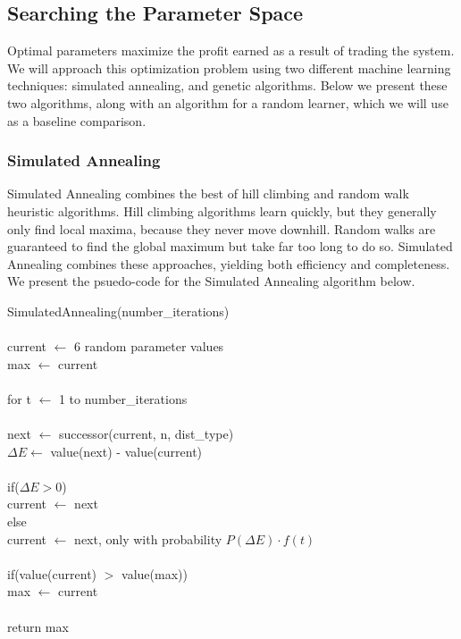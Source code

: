 \documentclass[10pt]{article}
\begin{document}
\subsection{Searching the Parameter Space}

Optimal parameters maximize the profit earned as a result of trading the
system.  We will approach this optimization problem using two different machine
learning techniques: simulated annealing, and genetic algorithms.  Below we
present these two algorithms, along with an algorithm for a random learner,
which we will use as a baseline comparison.

\pagebreak

\subsubsection{Simulated Annealing}

Simulated Annealing combines the best of hill climbing and random walk
heuristic algorithms.  Hill climbing algorithms learn quickly, but they
generally only find local maxima, because they never move downhill. Random
walks are guaranteed to find the global maximum but take far too long to do so.
Simulated Annealing combines these approaches, yielding both efficiency and
completeness.  We present the psuedo-code for the Simulated Annealing algorithm
below.

\setlength{\parindent}{5mm}
\indent SimulatedAnnealing(number\_iterations)\\\\
\indent \indent current $\leftarrow$ 6 random parameter values\\
\indent \indent max $\leftarrow$ current\\\\
\indent \indent for t $\leftarrow$ 1 to number\_iterations\\\\
\indent \indent \indent next $\leftarrow$ successor(current, n, dist\_type)\\
\indent \indent \indent $\Delta E \leftarrow$ value(next) - value(current)\\\\
\indent \indent \indent if($\Delta E > 0$)\\
\indent \indent \indent \indent current $\leftarrow$ next\\
\indent \indent \indent else\\
\indent \indent \indent \indent current $\leftarrow$ next, only with probability $P(\Delta E) \cdot f(t)$\\\\
\indent \indent \indent if(value(current) $>$ value(max))\\
\indent \indent \indent \indent max $\leftarrow$ current\\\\
\indent \indent return max\\
\setlength{\parindent}{0mm}
\end{document}

